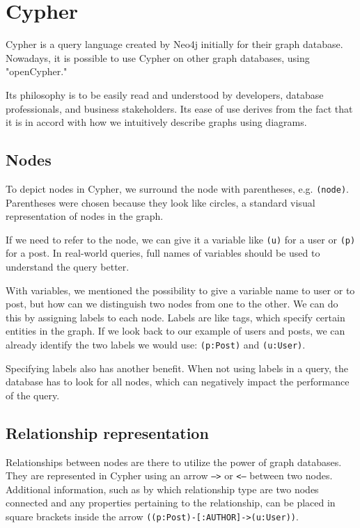 \section{Cypher}

Cypher is a query language created by Neo4j initially for their graph database. Nowadays, it is possible to use Cypher on other graph databases, using "openCypher." \cite{noauthor_resources_nodate}

Its philosophy is to be easily read and understood by developers, database professionals, and business stakeholders.
Its ease of use derives from the fact that it is in accord with how we intuitively describe graphs using diagrams. \cite{robinson_graph_2015}

\subsection{Nodes}

To depict nodes in Cypher, we surround the node with parentheses, e.g. \texttt{(node)}. Parentheses were chosen because they look like circles,
a standard visual representation of nodes in the graph. \cite{noauthor_getting_nodate}

If we need to refer to the node, we can give it a variable like \texttt{(u)} for a user or \texttt{(p)} for a post.
In real-world queries, full names of variables should be used to understand the query better.

With variables, we mentioned the possibility to give a variable name to user or to post, but how can we distinguish two nodes from one to the other.
We can do this by assigning labels to each node. Labels are like tags, which specify certain entities in the graph. If we look back to our example of users and posts,
we can already identify the two labels we would use: \texttt{(p:Post)} and \texttt{(u:User)}.

Specifying labels also has another benefit. When not using labels in a query, the database has to look for all nodes, which can negatively impact the performance of the query.
\cite{noauthor_getting_nodate}

\subsection{Relationship representation}

Relationships between nodes are there to utilize the power of graph databases. They are represented in Cypher using an arrow \texttt{-->}
or \texttt{<--} between two nodes. Additional information, such as by which relationship type are two nodes connected and any properties pertaining
to the relationship, can be placed in square brackets inside the arrow \texttt{((p:Post)-[:AUTHOR]->(u:User))}. \cite{noauthor_getting_nodate}

